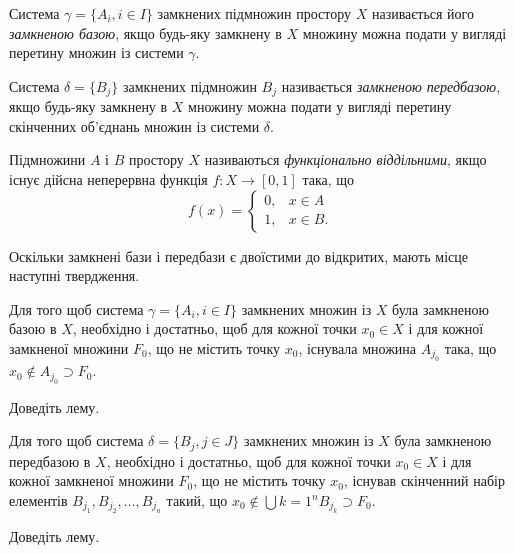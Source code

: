\documentclass[a4paper, 12pt]{article}
\begin{document}
\begin{definition}
	Система $\gamma = \{ A_i, i \in I\}$ замкнених підмножин
	простору $X$ називається його \textit{замкненою базою}, якщо будь-яку замкнену 
	в $X$ множину можна подати у вигляді перетину множин із системи $\gamma$.
\end{definition}

\begin{definition}
	Система $\delta = \{B_j\}$ замкнених підмножин $B_j$ називається \textit{замкненою
	передбазою}, якщо будь-яку замкнену в $X$ множину можна
	подати у вигляді перетину скінченних об'єднань множин із
	системи $\delta$.
\end{definition}

\begin{definition}
	Підмножини $A$ і $B$ простору $X$ називаються
	\textit{функціонально віддільними}, якщо існує дійсна неперервна
	функція $f: X \to [0, 1]$ така, що \[ f(x) = \begin{cases} 0, & x \in A \\ 1, & x \in B. \end{cases} \]
\end{definition}

Оскільки замкнені бази і передбази є двоїстими до
відкритих, мають місце наступні твердження.

\begin{lemma}
	Для того щоб система $\gamma = \{A_i, i \in I\}$
	замкнених множин із $X$ була замкненою базою в $X$,
	необхідно і достатньо, щоб для кожної точки $x_0 \in X$ і для
	кожної замкненої множини $F_0$, що не містить точку $x_0$,
	існувала множина $A_{j_0}$ така, що $x_0 \notin A_{j_0} \supset F_0$.
\end{lemma}

\begin{exercise}
	Доведіть лему.
\end{exercise}

\begin{lemma}
	Для того щоб система $\delta = \{B_j, j \in J\}$
	замкнених множин із $X$ була замкненою передбазою в $X$,
	необхідно і достатньо, щоб для кожної точки $x_0 \in X$ і для
	кожної замкненої множини $F_0$, що не містить точку $x_0$,
	існував скінченний набір елементів $B_{j_1}, B_{j_2}, \ldots, B_{j_n}$
	такий, що $x_0 \notin \bigcup{k = 1}^n B_{j_k} \supset F_0$.
\end{lemma}

\begin{exercise}
	Доведіть лему.
\end{exercise}
\end{document}
